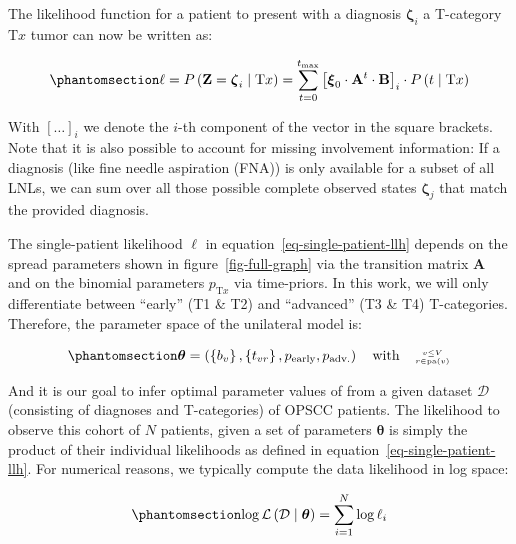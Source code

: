\documentclass[
  sn-mathphys-num,
]{sn-jnl}
\begin{document}
The likelihood function for a patient to present with a diagnosis
\(\boldsymbol{\zeta}_i\) a T-category \(\text{T}x\) tumor can now be
written as:

\begin{equation}\phantomsection\label{eq-single-patient-llh}{
\ell = P \left( \mathbf{Z} = \boldsymbol{\zeta}_i \mid \text{T}x \right) = \sum_{t=0}^{t_\text{max}} \left[ \boldsymbol{\xi}_0 \cdot \mathbf{A}^t \cdot \mathbf{B} \right]_i \cdot P \left( t \mid \text{T}x \right)
}\end{equation}

With \(\left[ \ldots \right]_i\) we denote the \(i\)-th component of the
vector in the square brackets. Note that it is also possible to account
for missing involvement information: If a diagnosis (like fine needle
aspiration (FNA)) is only available for a subset of all LNLs, we can sum
over all those possible complete observed states
\(\boldsymbol{\zeta}_j\) that match the provided diagnosis.

The single-patient likelihood \(\ell\) in
equation~\ref{eq-single-patient-llh} depends on the spread parameters
shown in figure~\ref{fig-full-graph} via the transition matrix
\(\mathbf{A}\) and on the binomial parameters \(p_{\text{T}x}\) via
time-priors. In this work, we will only differentiate between ``early''
(T1 \& T2) and ``advanced'' (T3 \& T4) T-categories. Therefore, the
parameter space of the unilateral model is:

\begin{equation}\phantomsection\label{eq-param-space}{
\boldsymbol{\theta} = \left( \left\{ b_v \right\}, \left\{ t_{vr} \right\}, p_\text{early}, p_\text{adv.} \right) \quad \text{with} \quad \genfrac{}{}{0pt}{2}{v\leq V}{r\in\operatorname{pa}(v)}
}\end{equation}

And it is our goal to infer optimal parameter values of from a given
dataset \(\mathcal{D}\) (consisting of diagnoses and T-categories) of
OPSCC patients. The likelihood to observe this cohort of \(N\) patients,
given a set of parameters \(\boldsymbol{\theta}\) is simply the product
of their individual likelihoods as defined in
equation~\ref{eq-single-patient-llh}. For numerical reasons, we
typically compute the data likelihood in log space:

\begin{equation}\phantomsection\label{eq-log-likelihood}{
\log \mathcal{L} \left( \mathcal{D} \mid \boldsymbol{\theta} \right) = \sum_{i=1}^N \log \ell_i
}\end{equation}
\end{document}
